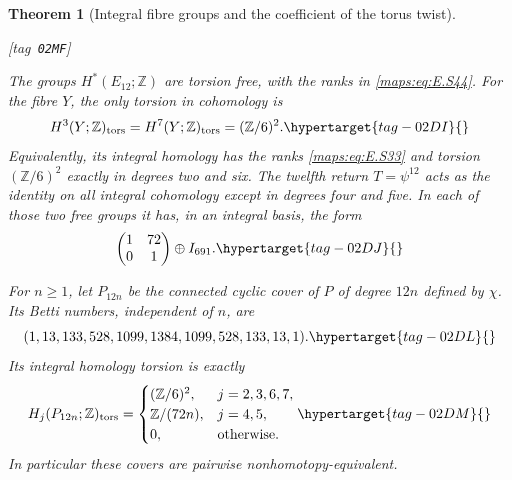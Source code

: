 \documentclass[11pt,a4paper]{article}
\numberwithin{equation}{section}
\newtheorem{theorem}{Theorem}[section]
\theoremstyle{definition}
\newcommand{\StatementRecord}[4]{{\upshape\footnotesize[tag~\texttt{#3}]}\enspace\ignorespaces}
\begin{document}
\begin{theorem}[Integral fibre groups and the coefficient of the torus twist]\hypertarget{tag-02MF}{}\label{maps:src:E.2.15}
\StatementRecord{maps:src:E.2.15}{proved}{02MF}{\eqref{maps:eq:E.S44}, \eqref{maps:eq:E.S33}, \eqref{maps:eq:E.S42}, \eqref{maps:eq:E.S53}, \eqref{maps:eq:E.S29}, \eqref{maps:eq:E.S38}, \eqref{maps:eq:E.S40}, \eqref{maps:eq:E.S37}, \eqref{maps:eq:E.S55}}


The groups $H^*(E_{12};\mathbb Z)$ are torsion free, with
the ranks in \eqref{maps:eq:E.S44}. For the fibre $Y$, the only
torsion in cohomology is
\begin{equation}
       H^3(Y;\mathbb Z)_{\rm tors}
       =H^7(Y;\mathbb Z)_{\rm tors}=(\mathbb Z/6)^2.
 \hypertarget{tag-02DI}{}\label{maps:eq:E.S48}
\end{equation}
Equivalently, its integral homology has the ranks \eqref{maps:eq:E.S33}
and torsion $(\mathbb Z/6)^2$ exactly in degrees two and six.
The twelfth return $T=\psi^{12}$ acts as the identity on
all integral cohomology except in degrees four and five.
In each of those two free groups it has, in an integral
basis, the form
\begin{equation}
             \begin{pmatrix}1&72\\0&1\end{pmatrix}
                                  \oplus I_{691}.
 \hypertarget{tag-02DJ}{}\label{maps:eq:E.S49}
\end{equation}

For $n\geq1$, let $P_{12n}$ be the connected cyclic cover
of $P$ of degree $12n$ defined by $\chi$. Its Betti numbers,
independent of $n$, are
\begin{equation}
       (1,13,133,528,1099,1384,1099,528,133,13,1).
 \hypertarget{tag-02DL}{}\label{maps:eq:E.S50}
\end{equation}
Its integral homology torsion is exactly
\begin{equation}
 H_j(P_{12n};\mathbb Z)_{\rm tors}=
 \begin{cases}
       (\mathbb Z/6)^2,&j=2,3,6,7,\\
       \mathbb Z/(72n),&j=4,5,\\
       0,&\text{otherwise}.
 \end{cases}
 \hypertarget{tag-02DM}{}\label{maps:eq:E.S51}
\end{equation}
In particular these covers are pairwise nonhomotopy-equivalent.
\end{theorem}
\end{document}
